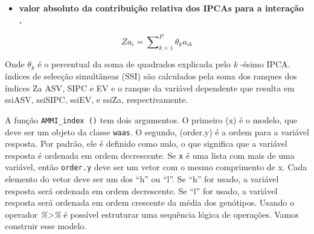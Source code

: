 \documentclass[
]{book}
\newenvironment{Shaded}{\begin{snugshade}}{\end{snugshade}}
\newcommand{\CommentTok}[1]{\textcolor[rgb]{0.56,0.35,0.01}{\textit{#1}}}
\newcommand{\DataTypeTok}[1]{\textcolor[rgb]{0.13,0.29,0.53}{#1}}
\newcommand{\KeywordTok}[1]{\textcolor[rgb]{0.13,0.29,0.53}{\textbf{#1}}}
\newcommand{\NormalTok}[1]{#1}
\newcommand{\OperatorTok}[1]{\textcolor[rgb]{0.81,0.36,0.00}{\textbf{#1}}}
\newcommand{\OtherTok}[1]{\textcolor[rgb]{0.56,0.35,0.01}{#1}}
\newcommand{\StringTok}[1]{\textcolor[rgb]{0.31,0.60,0.02}{#1}}
\providecommand{\tightlist}{%
  \setlength{\itemsep}{0pt}\setlength{\parskip}{0pt}}
\begin{document}
\begin{itemize}
\tightlist
\item
  \textbf{valor absoluto da contribuição relativa dos IPCAs para a interação \citep{Zali2012}.}
\end{itemize}

\[
Z{a_i} = \sum\nolimits_{k = 1}^P {{\theta _k}{a_{ik}}}
\]

Onde \({\theta _k}\) é o percentual da soma de quadrados explicada pelo \emph{k} -ésimo IPCA. índices de selecção simultâneas (SSI) são calculados pela soma dos ranques dos índices Za ASV, SIPC e EV e o ranque da variável dependente \citep{Farshadfar2008} que resulta em ssiASV, ssiSIPC, ssiEV, e ssiZa, respectivamente.

A função \texttt{AMMI\_index\ ()} tem dois argumentos. O primeiro (x) é o modelo, que deve ser um objeto da classe \texttt{waas}. O segundo, (order.y) é a ordem para a variável resposta. Por padrão, ele é definido como nulo, o que significa que a variável resposta é ordenada em ordem decrescente. Se \texttt{x} é uma lista com mais de uma variável, então \texttt{order.y} deve ser um vetor com o mesmo comprimento de x. Cada elemento do vetor deve ser um dos ``h'' ou ``l''. Se ``h'' for usado, a variável resposta será ordenada em ordem decrescente. Se ``l'' for usado, a variável resposta será ordenada em ordem crescente da média dos genótipos. Usando o operador \emph{\%\textgreater\% } é possível estruturar uma sequência lógica de operações. Vamos construir esse modelo.

\begin{Shaded}
\end{Shaded}
\end{document}
